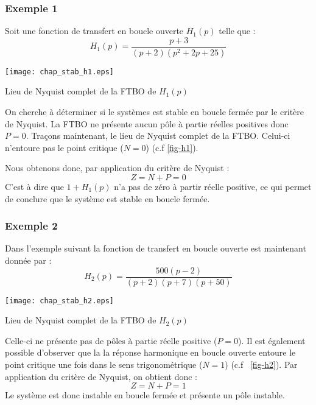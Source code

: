 \subsubsection*{Exemple 1}
Soit une fonction de transfert en boucle ouverte $H_1(p)$ telle que :
\[
        H_1(p)=\dfrac{p+3}{(p+2)(p^2+2p+25)}
\]
\begin{marginfigure}
    \centering
    \texttt{[image: chap\_stab\_h1.eps]}
    \caption{Lieu de Nyquist complet de la FTBO de $H_1(p)$\label{fig-h1}}
\end{marginfigure}
On cherche à déterminer si le systèmes est stable en boucle fermée par le
critère de Nyquist. La FTBO ne présente aucun pôle à partie réelles positives
donc $P=0$. Traçons maintenant, le lieu de Nyquist complet de la FTBO. Celui-ci
n'entoure pas le point critique ($N=0$) (c.f \cref{fig-h1}).

Nous obtenons donc, par application du critère de Nyquist :
\[
    Z=N+P=0
\]
C'est à dire que $1+H_1(p)$ n'a pas de zéro à partir réelle positive, ce
qui permet de conclure que le système est stable en boucle fermée.
\subsubsection*{Exemple 2}
Dans l'exemple suivant la fonction de transfert en boucle ouverte est 
maintenant donnée par :
\[
        H_2(p)=\dfrac{500(p-2)}{(p+2)(p+7)(p+50)}
\]
\begin{marginfigure}
    \centering
    \texttt{[image: chap\_stab\_h2.eps]}
    \caption{Lieu de Nyquist complet de la FTBO de $H_2(p)$\label{fig-h2}}
\end{marginfigure}
Celle-ci ne présente pas de pôles à partie réelle positive ($P=0$). Il est
également possible d'observer que la la réponse harmonique en boucle ouverte
entoure le point critique une fois dans le sens trigonométrique ($N=1$) 
(c.f ~\cref{fig-h2}). 
Par application du critère de Nyquist, on obtient donc :
\[
    Z=N+P=1
\]
Le système est donc instable en boucle fermée et présente un pôle instable.

